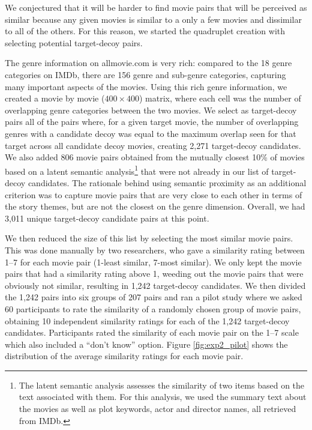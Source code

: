\documentclass[12pt, a4paper]{article}
\begin{document}
We conjectured that it will be harder to find movie pairs that will be perceived as similar because any given movies is similar to a only a few movies and dissimilar to all of the others. For this reason, we started the quadruplet creation with selecting potential target-decoy pairs.

The genre information on allmovie.com is very rich: compared to the 18 genre categories on IMDb, there are 156 genre and sub-genre categories, capturing many important aspects of the movies. Using this rich genre information, we created a movie by movie ($400 \times 400$) matrix, where each cell was the number of overlapping genre categories between the two movies. We select as target-decoy pairs all of the pairs where, for a given target movie, the number of overlapping genres with a candidate decoy was equal to the maximum overlap seen for that target across all candidate decoy movies, creating 2,271 target-decoy candidates.
We also added 806 movie pairs obtained from the mutually closest 10\% of movies based on a latent semantic analysis\footnote{The latent semantic analysis assesses the similarity of two items based on the text associated with them. For this analysis, we used the summary text about the movies as well as plot keywords, actor and director names, all retrieved from IMDb.} that were not already in our list of target-decoy candidates. The rationale behind using semantic proximity as an additional criterion was to capture movie pairs that are very close to each other in terms of the story themes, but are not the closest on the genre dimension. Overall, we had 3,011 unique target-decoy candidate pairs at this point.

We then reduced the size of this list by selecting the most similar movie pairs. This was done manually by two researchers, who gave a similarity rating between 1--7 for each movie pair (1-least similar, 7-most similar). We only kept the movie pairs that had a similarity rating above 1, weeding out the movie pairs that were obviously not similar, resulting in 1,242 target-decoy candidates. We then divided the 1,242 pairs into six groups of 207 pairs and ran a pilot study where we asked 60 participants to rate the similarity of a randomly chosen group of movie pairs, obtaining 10 independent similarity ratings for each of the 1,242 target-decoy candidates. Participants rated the similarity of each movie pair on the 1--7 scale which also included a ``don't know'' option. Figure \ref{fig:exp2_pilot}  shows the distribution of the average similarity ratings for each movie pair.
\end{document}
